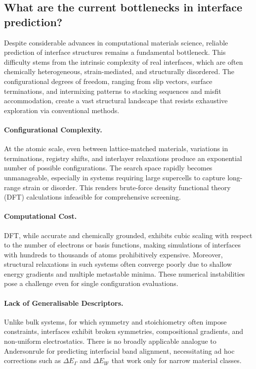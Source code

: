 \subsection{What are the current bottlenecks in interface prediction?} 
 
Despite considerable advances in computational materials science, reliable prediction of interface structures remains a fundamental bottleneck. This difficulty stems from the intrinsic complexity of real interfaces, which are often chemically heterogeneous, strain-mediated, and structurally disordered. The configurational degrees of freedom, ranging from slip vectors, surface terminations, and intermixing patterns to stacking sequences and misfit accommodation, create a vast structural landscape that resists exhaustive exploration via conventional methods. 
 
\paragraph{Configurational Complexity.} At the atomic scale, even between lattice-matched materials, variations in terminations, registry shifts, and interlayer relaxations produce an exponential number of possible configurations. The search space rapidly becomes unmanageable, especially in systems requiring large supercells to capture long-range strain or disorder. This renders brute-force density functional theory (DFT) calculations infeasible for comprehensive screening. 
 
\paragraph{Computational Cost.} DFT, while accurate and chemically grounded, exhibits cubic scaling with respect to the number of electrons or basis functions, making simulations of interfaces with hundreds to thousands of atoms prohibitively expensive. Moreover, structural relaxations in such systems often converge poorly due to shallow energy gradients and multiple metastable minima. These numerical instabilities pose a challenge even for single configuration evaluations. 
 
\paragraph{Lack of Generalisable Descriptors.} Unlike bulk systems, for which symmetry and stoichiometry often impose constraints, interfaces exhibit broken symmetries, compositional gradients, and non-uniform electrostatics. There is no broadly applicable analogue to Anderson\rqss rule for predicting interfacial band alignment, necessitating ad hoc corrections such as $\Delta E_\Gamma$ and $\Delta E_{\mathrm{IF}}$ that work only for narrow material classes. 
 
